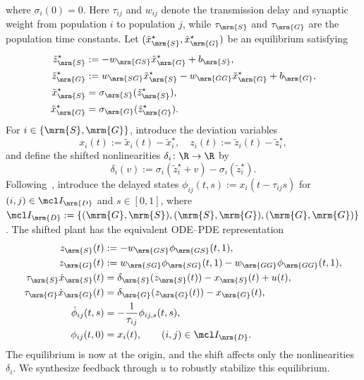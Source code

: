 where $\sigma_i(0)=0$. Here $\tau_{ij}$ and $w_{ij}$ denote the transmission
delay and synaptic weight from population $i$ to population $j$, while
$\tau_{\mrm{S}}$ and $\tau_{\mrm{G}}$ are the population time constants.
Let $(\tilde x_{\mrm{S}}^\star,\tilde x_{\mrm{G}}^\star)$ be an equilibrium
satisfying
\begin{align*}
      \tilde z_{\mrm{S}}^\star&:=-w_{\mrm{GS}}\tilde x_{\mrm{G}}^\star+b_{\mrm{S}},\\
      \tilde z_{\mrm{G}}^\star&:=w_{\mrm{SG}}\tilde x_{\mrm{S}}^\star
          -w_{\mrm{GG}}\tilde x_{\mrm{G}}^\star+b_{\mrm{G}},\\
      \tilde x_{\mrm{S}}^\star
          &=\sigma_{\mrm{S}}(\tilde z_{\mrm{S}}^\star),\\
      \tilde x_{\mrm{G}}^\star
          &=\sigma_{\mrm{G}}(\tilde z_{\mrm{G}}^\star).
\end{align*}
For $i\in\{\mrm{S},\mrm{G}\}$, introduce the deviation variables
\begin{equation*}
x_i(t):=\tilde{x}_i(t)-\tilde x_i^\star,
\quad
z_i(t):=\tilde{z}_i(t)-\tilde z_i^\star,
\end{equation*}
and define the shifted nonlinearities $\delta_i\colon\R\to\R$ by
\begin{equation*}
\delta_i(v):=\sigma_i(\tilde z_i^\star+v)-\sigma_i(\tilde z_i^\star).
\end{equation*}
Following~\cite{peet2020representationnetworkssystemsdelay}, introduce
the delayed states $\phi_{ij}(t,s):=x_i(t-\tau_{ij}s)$ for
$(i,j)\in\mcl I_{\mrm{D}}$ and $s\in[0,1]$, where
$\mcl I_{\mrm{D}}:=\{(\mrm{G},\mrm{S}),(\mrm{S},\mrm{G}),(\mrm{G},\mrm{G})\}$.
The shifted plant has the equivalent ODE--PDE representation
\begin{equation}\label{eq:stn-gpe_ode-pde}
\begin{aligned}
z_{\mrm{S}}(t)
    &:= -w_{\mrm{GS}}\phi_{\mrm{GS}}(t,1),\\
z_{\mrm{G}}(t)
    &:= w_{\mrm{SG}}\phi_{\mrm{SG}}(t,1)
        -w_{\mrm{GG}}\phi_{\mrm{GG}}(t,1),\\
\tau_{\mrm{S}}\dot{x}_{\mrm{S}}(t)
    &= \delta_{\mrm{S}}(z_{\mrm{S}}(t))-x_{\mrm{S}}(t)+u(t),\\
\tau_{\mrm{G}}\dot{x}_{\mrm{G}}(t)
    &= \delta_{\mrm{G}}(z_{\mrm{G}}(t))-x_{\mrm{G}}(t),\\
\dot{\phi}_{ij}(t,s)
    &= -\frac{1}{\tau_{ij}}\phi_{ij,s}(t,s),\\
\phi_{ij}(t,0)
    &= x_i(t),\qquad (i,j)\in\mcl I_{\mrm{D}}.
\end{aligned}
\end{equation}
The equilibrium is now at the origin, and the shift affects only the
nonlinearities $\delta_i$. We synthesize feedback through $u$ to robustly
stabilize this equilibrium.

